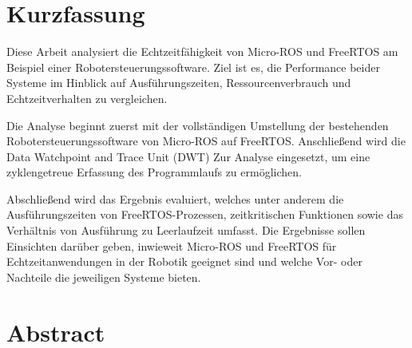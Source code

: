 \section*{Kurzfassung}

Diese Arbeit analysiert die Echtzeitfähigkeit von Micro-ROS und FreeRTOS am
Beispiel einer Robotersteuerungssoftware. Ziel ist es, die Performance beider
Systeme im Hinblick auf Ausführungszeiten, Ressourcenverbrauch und
Echtzeitverhalten zu vergleichen.

Die Analyse beginnt zuerst mit der vollständigen Umstellung der bestehenden
Robotersteuerungssoftware von Micro-ROS auf FreeRTOS. Anschließend wird die Data
Watchpoint and Trace Unit (DWT) Zur Analyse eingesetzt, um eine zyklengetreue
Erfassung des Programmlaufs zu ermöglichen.

Abschließend wird das Ergebnis evaluiert, welches unter anderem die
Ausführungszeiten von FreeRTOS-Prozessen, zeitkritischen Funktionen sowie das
Verhältnis von Ausführung zu Leerlaufzeit umfasst. Die Ergebnisse sollen
Einsichten darüber geben, inwieweit Micro-ROS und FreeRTOS für
Echtzeitanwendungen in der Robotik geeignet sind und welche Vor- oder Nachteile
die jeweiligen Systeme bieten.

\section*{Abstract}
